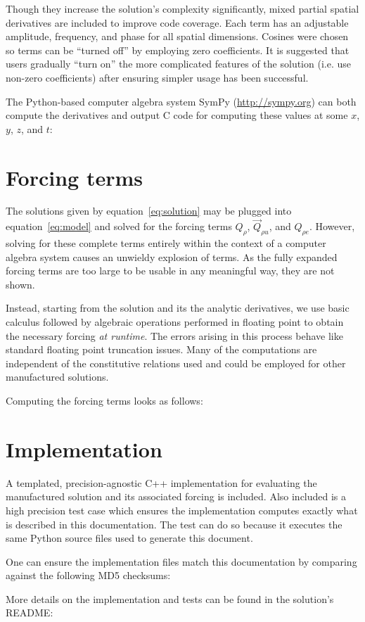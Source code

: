 \documentclass[10pt,reqno]{amsart}
\begin{document}
Though they increase the solution's complexity significantly, mixed partial
spatial derivatives are included to improve code coverage.  Each term has an
adjustable amplitude, frequency, and phase for all spatial dimensions.  Cosines
were chosen so terms can be ``turned off'' by employing zero coefficients.  It
is suggested that users gradually ``turn on'' the more complicated features of
the solution (i.e. use non-zero coefficients) after ensuring simpler usage has
been successful.

The Python-based computer algebra system SymPy (\url{http://sympy.org})
can both compute the derivatives and output C code for computing these
values at some $x$, $y$, $z$, and $t$:


\section{Forcing terms}
\label{sec:forcing}

The solutions given by equation~\eqref{eq:solution} may be plugged into
equation~\eqref{eq:model} and solved for the forcing terms $Q_{\rho}$,
$\vec{Q}_{\rho{}u}$, and $Q_{\rho{}e}$.  However, solving for these complete
terms entirely within the context of a computer algebra system causes an
unwieldy explosion of terms.  As the fully expanded forcing terms are too
large to be usable in any meaningful way, they are not shown.

Instead, starting from the solution and its the analytic derivatives, we use
basic calculus followed by algebraic operations performed in floating point to
obtain the necessary forcing \emph{at runtime}.  The errors arising in this
process behave like standard floating point truncation issues.  Many of the
computations are independent of the constitutive relations used and could be
employed for other manufactured solutions.

Computing the forcing terms looks as follows:


\section{Implementation}

A templated, precision-agnostic C++ implementation for evaluating the
manufactured solution and its associated forcing is included.  Also included is
a high precision test case which ensures the implementation computes exactly
what is described in this documentation.  The test can do so because it
executes the same Python source files used to generate this document.

One can ensure the implementation files match this documentation by comparing
against the following MD5 checksums:



More details on the implementation and tests can be found in the solution's
README:


\end{document}

